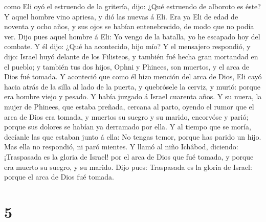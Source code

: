 como Eli oyó el estruendo de la gritería, dijo: ¿Qué estruendo de
alboroto es éste? Y aquel hombre vino apriesa, y dió las nuevas á Eli.
 Era ya Eli de edad de noventa y ocho años, y sus ojos se
habían entenebrecido, de modo que no podía ver.  Dijo
pues aquel hombre á Eli: Yo vengo de la batalla, yo he escapado hoy del
combate. Y él dijo: ¿Qué ha acontecido, hijo mío?  Y el
mensajero respondió, y dijo: Israel huyó delante de los Filisteos, y
también fué hecha gran mortandad en el pueblo; y también tus dos hijos,
Ophni y Phinees, son muertos, y el arca de Dios fué tomada.
 Y aconteció que como él hizo mención del arca de Dios,
Eli cayó hacia atrás de la silla al lado de la puerta, y quebrósele la
cerviz, y murió: porque era hombre viejo y pesado. Y había juzgado á
Israel cuarenta años.  Y su nuera, la mujer de Phinees,
que estaba preñada, cercana al parto, oyendo el rumor que el arca de
Dios era tomada, y muertos su suegro y su marido, encorvóse y parió;
porque sus dolores se habían ya derramado por ella.  Y al
tiempo que se moría, decíanle las que estaban junto á ella: No tengas
temor, porque has parido un hijo. Mas ella no respondió, ni paró
mientes.  Y llamó al niño Ichâbod, diciendo: ¡Traspasada
es la gloria de Israel! por el arca de Dios que fué tomada, y porque era
muerto su suegro, y su marido.  Dijo pues: Traspasada es
la gloria de Israel: porque el arca de Dios fué tomada.

\hypertarget{section-4}{%
\section{5}\label{section-4}}

